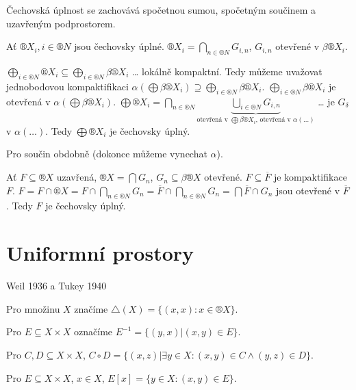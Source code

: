 \documentclass[12pt]{article}					%
\begin{document}
    \begin{tvrzeni}
        Čechovská úplnost se zachovává spočetnou sumou, spočetným součinem a uzavřeným podprostorem.

        \begin{dukazin}
            Ať $®X_i, i \in ®N$ jsou čechovsky úplné. $®X_i = \bigcap_{n \in ®N}G_{i, n}$, $G_{i, n}$ otevřené v $\beta®X_i$.

            $\bigoplus_{i \in ®N} ®X_i \subseteq \bigoplus_{i \in ®N} \beta®X_i$ … lokálně kompaktní. Tedy můžeme uvažovat jednobodovou kompaktifikaci $\alpha(\bigoplus \beta®X_i) \supseteq \bigoplus_{i \in ®N} \beta®X_i$. $\bigoplus_{i \in ®N} \beta®X_i$ je otevřená v $\alpha(\bigoplus \beta®X_i)$. $\bigoplus®X_i = \bigcap_{n \in ®N} \underbrace{\bigcup_{i \in ®N} G_{i, n}}_{\text{otevřená v $\bigoplus\beta®X_i$, otevřená v $\alpha(…)$}}$ … je $G_\delta$ v $\alpha(…)$. Tedy $\bigoplus ®X_i$ je čechovsky úplný.

            Pro součin obdobně (dokonce můžeme vynechat $\alpha$).

            Ať $F \subseteq ®X$ uzavřená, $®X = \bigcap G_n$, $G_n \subseteq \beta ®X$ otevřené. $F \subseteq \overline{F}$ je kompaktifikace $F$. $F = F\cap ®X = F \cap \bigcap_{n \in ®N} G_n = \overline{F} \cap \bigcap_{n \in ®N} G_n = \bigcap \overline{F} \cap G_n$ jsou otevřené v $\overline{F}$. Tedy $F$ je čechovsky úplný.
        \end{dukazin}
    \end{tvrzeni}


\section{Uniformní prostory}
    Weil 1936 a Tukey 1940

    \begin{poznamka}
        Pro množinu $X$ značíme $\triangle(X) = \{(x, x): x \in ®X\}$.

        Pro $E \subseteq X \times X$ označíme $E^{-1} = \{(y, x)| (x, y) \in E\}$.

        Pro $C, D \subseteq X \times X$, $C \circ D = \{(x, z)| \exists y \in X: (x, y) \in C \land (y, z) \in D\}$.

        Pro $E \subseteq X \times X$, $x \in X$, $E[x] = \{y \in X: (x, y) \in E\}$.
    \end{poznamka}
    
\end{document}
